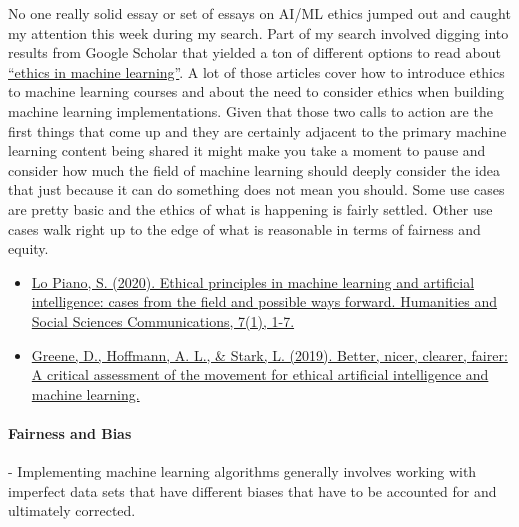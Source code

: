 \documentclass{article}
\begin{document}
No one really solid essay or set of essays on AI/ML ethics jumped out and caught my attention this week during my search. Part of my search involved digging into results from Google Scholar that yielded a ton of different options to read about \href{https://scholar.google.com/scholar?q=ethics+in+machine+learning&hl=en&as_sdt=0&as_vis=1&oi=scholart}{“ethics in machine learning”}. A lot of those articles cover how to introduce ethics to machine learning courses and about the need to consider ethics when building machine learning implementations. Given that those two calls to action are the first things that come up and they are certainly adjacent to the primary machine learning content being shared it might make you take a moment to pause and consider how much the field of machine learning should deeply consider the idea that just because it can do something does not mean you should. Some use cases are pretty basic and the ethics of what is happening is fairly settled. Other use cases walk right up to the edge of what is reasonable in terms of fairness and equity.

\begin{itemize}
\item \href{https://www.nature.com/articles/s41599-020-0501-9.pdf}{Lo Piano, S. (2020). Ethical principles in machine learning and artificial intelligence: cases from the field and possible ways forward. Humanities and Social Sciences Communications, 7(1), 1-7.} \cite{lo2020ethical}  
\item \href{https://scholarspace.manoa.hawaii.edu/server/api/core/bitstreams/849782a6-06bf-4ce8-9144-a93de4455d1c/content}{Greene, D., Hoffmann, A. L., \& Stark, L. (2019). Better, nicer, clearer, fairer: A critical assessment of the movement for ethical artificial intelligence and machine learning.} \cite{greene2019better}  
\end{itemize}

\paragraph{Fairness and Bias} - Implementing machine learning algorithms generally involves working with imperfect data sets that have different biases that have to be accounted for and ultimately corrected. 
\end{document}
